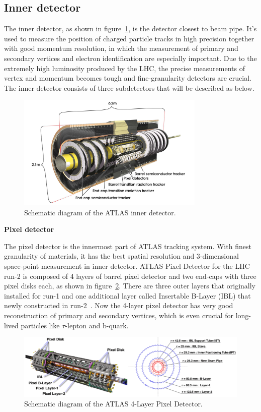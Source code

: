 \subsection{Inner detector}

The inner detector, as shown in figure~\ref{fig:inner_dec}, is the detector closest to beam pipe.
It's used to measure the position of charged particle tracks in high precision together with good momentum resolution,
in which the measurement of primary and secondary vertices and electron identification are especially important.
Due to the extremely high luminosity produced by the LHC, the precise measurements of vertex and momentum becomes tough and fine-granularity detectors are crucial.
The inner detector consists of three subdetectors that will be described as below.
\begin{figure}[!htb]
  \centering
  \includegraphics[width=0.8\textwidth]{figures/Detector/ID_newTRT_d3.png}
  \caption{Schematic diagram of the ATLAS inner detector\cite{Aad:1698966}.}
  \label{fig:inner_dec}
\end{figure}

\textbf{Pixel detector}

The pixel detector is the innermost part of ATLAS tracking system.
With finest granularity of materials, it has the best spatial resolution and 3-dimensional space-point measurement in inner detector.
ATLAS Pixel Detector for the LHC run-2 is composed of 4 layers of barrel pixel detector and two end-caps with three pixel disks each, as shown in figure~\ref{fig:inner_pixel}.
There are three outer layers that originally installed for run-1 and one additional layer called Insertable B-Layer (IBL) that newly constructed in run-2~\cite{Mullier:2016}.
Now the 4-layer pixel detector has very good reconstruction of primary and secondary vertices, which is even crucial for long-lived particles like $\tau$-lepton and b-quark.
\begin{figure}[!htb]
  \centering
  \includegraphics[width=1.0\textwidth]{figures/Detector/inner_pixel.png}
  \caption{Schematic diagram of the ATLAS 4-Layer Pixel Detector.}
  \label{fig:inner_pixel}
\end{figure}

